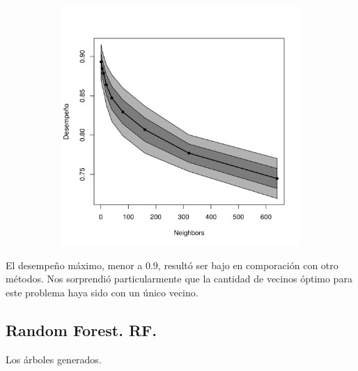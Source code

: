 \documentclass[a4paper,10pt]{article}
\begin{document}
\begin{figure}[H]
  \centering
  \begin{subfigure}[b]{0.4\textwidth}
    \includegraphics[width=\textwidth]{../imagenes/knn-n_neighbors}
     \caption{}
  \end{subfigure}
  \label{fig:knn-n_neighbors}
\end{figure}

El desempeño m\'aximo, menor a 0.9, result\'o ser bajo en comporaci\'on con otro m\'etodos. Nos sorprendi\'o particularmente que la cantidad de vecinos \'optimo para este problema haya sido con un \'unico vecino. 




\subsection{Random Forest. RF.}

Los \'arboles generados. 
\end{document}

